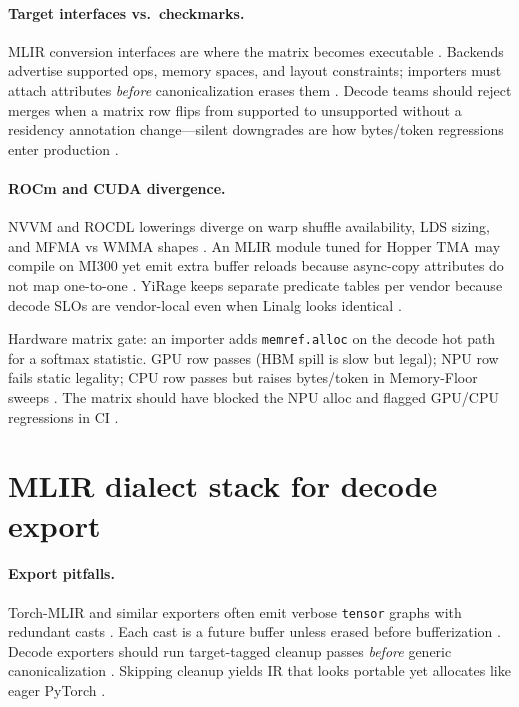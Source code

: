\paragraph{Target interfaces vs.\ checkmarks.} MLIR conversion interfaces are where the matrix becomes executable \citep{chen2020compilerbasedhardw}. Backends advertise supported ops, memory spaces, and layout constraints; importers must attach attributes \emph{before} canonicalization erases them \citep{yirage2026}. Decode teams should reject merges when a matrix row flips from supported to unsupported without a residency annotation change---silent downgrades are how bytes/token regressions enter production \citep{memoryfloor2026}.

\paragraph{ROCm and CUDA divergence.} NVVM and ROCDL lowerings diverge on warp shuffle availability, LDS sizing, and MFMA vs WMMA shapes \citep{nvidia2022hopper,liu2024deepseekv3}. An MLIR module tuned for Hopper TMA may compile on MI300 yet emit extra buffer reloads because async-copy attributes do not map one-to-one \citep{semianalysis2024tma}. YiRage keeps separate predicate tables per vendor because decode SLOs are vendor-local even when Linalg looks identical \citep{yirage2026,taxbreak2026}.

\begin{example}
Hardware matrix gate: an importer adds \texttt{memref.alloc} on the decode hot path for a softmax statistic. GPU row passes (HBM spill is slow but legal); NPU row fails static legality; CPU row passes but raises bytes/token in Memory-Floor sweeps \citep{memoryfloor2026,amd2024xdna}. The matrix should have blocked the NPU alloc and flagged GPU/CPU regressions in CI \citep{yirage2026}.
\end{example}

\section{MLIR dialect stack for decode export}
\label{sec:ch14_dialect_stack}

\paragraph{Export pitfalls.} Torch-MLIR and similar exporters often emit verbose \texttt{tensor} graphs with redundant casts \citep{chen2020compilerbasedhardw,yirage2026}. Each cast is a future buffer unless erased before bufferization \citep{memoryfloor2026}. Decode exporters should run target-tagged cleanup passes \emph{before} generic canonicalization \citep{amd2024xdna,patel2025llminference}. Skipping cleanup yields IR that looks portable yet allocates like eager PyTorch \citep{taxbreak2026,kwon2023vllm}.

